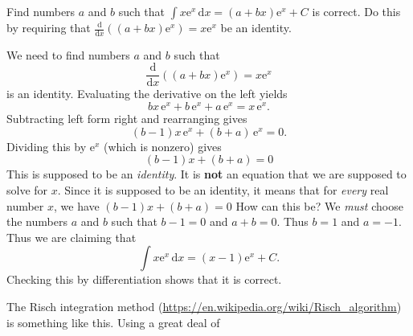\documentclass[12pt,fleqn,answers]{exam}
\newcommand{\reals}{\mathbf{R}}
\begin{document}
\begin{questions}


\question [1] Find numbers $a$ and $b$ such that
$
 \int x  \mathrm{e}^x \, \mathrm{d} x = (a + b x) \mathrm{e}^x + C
$
is correct. Do this by requiring that
$
\frac{\mathrm{d}}{\mathrm{d} x} \left((a + b x) \mathrm{e}^x \right)
   = x  \mathrm{e}^x
$ be an identity.
\begin{solution}
We need to find numbers $a$ and $b$ such that 
\begin{equation*}
  \frac{\mathrm{d}}{\mathrm{d} x}
  \left((a + b x) \mathrm{e}^x \right) = x  \mathrm{e}^x
\end{equation*}
is an identity. Evaluating the derivative on the left yields
\begin{equation*}
  b x\, {{\mathrm e}^{x}}+b\, {{\mathrm e}^{x}}+a\, {{\mathrm e}^{x}}=x\, {{\mathrm e}^{x}}.
\end{equation*}
Subtracting left form right and rearranging gives
\begin{equation*}
  \left( b-1\right)  x\, {{\mathrm e}^{x}}+\left( b+a\right) \, {{\mathrm e}^{x}}=0.
\end{equation*}
Dividing this by ${\mathrm e}^{x}$ (which is nonzero) gives
\begin{equation*}
  \left( b-1\right)  x +\left( b+a\right) =0
\end{equation*}
This is supposed to be an \emph{identity}. It is \textbf{not}
an equation that we are supposed to solve for $x$. Since 
it is supposed to be an identity, it means that for
\emph{every} real number $x$, we have $\left( b-1\right)  x +\left( b+a\right) =0$
How can this be? We \emph{must} choose the numbers $a$ and
$b$ such that $b-1= 0$ and $a+b=0$. Thus $b=1$ and $a=-1$.
Thus we are claiming that
$$
 \int x  \mathrm{e}^x \, \mathrm{d} x = (x - 1) \mathrm{e}^x + C.
$$
Checking this by differentiation shows that it is correct.

\quad The Risch integration method (\url{https://en.wikipedia.org/wiki/Risch_algorithm}) 
is something like this. Using a great deal of 
\end{solution}

\end{questions}
\end{document}
